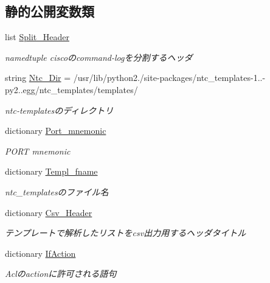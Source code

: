 \subsection*{静的公開変数類}
\begin{DoxyCompactItemize}
\item 
list \mbox{\hyperlink{classCTextFsm_1_1CTextFsm_aaae27a35f146f70f11ec0d40df0c8cdb}{Split\+\_\+\+Header}}
\begin{DoxyCompactList}\small\item\em namedtuple ciscoのcommand-\/logを分割するヘッダ \end{DoxyCompactList}\item 
\mbox{\label{classCTextFsm_1_1CTextFsm_abdcfff561e440d13d71126a84a9bfeab}} 
string \mbox{\hyperlink{classCTextFsm_1_1CTextFsm_abdcfff561e440d13d71126a84a9bfeab}{Ntc\+\_\+\+Dir}} = \textquotesingle{}/usr/lib/python2./site-\/packages/ntc\+\_\+templates-\/1..-\/py2..\+egg/ntc\+\_\+templates/templates/\textquotesingle{}
\begin{DoxyCompactList}\small\item\em ntc-\/templatesのディレクトリ \end{DoxyCompactList}\item 
dictionary \mbox{\hyperlink{classCTextFsm_1_1CTextFsm_a38d02993201dbf1e37d4025693d9a225}{Port\+\_\+mnemonic}}
\begin{DoxyCompactList}\small\item\em P\+O\+RT mnemonic \end{DoxyCompactList}\item 
dictionary \mbox{\hyperlink{classCTextFsm_1_1CTextFsm_afb88b6e8121f75c289acca130ebf33ab}{Templ\+\_\+fname}}
\begin{DoxyCompactList}\small\item\em ntc\+\_\+templatesのファイル名 \end{DoxyCompactList}\item 
dictionary \mbox{\hyperlink{classCTextFsm_1_1CTextFsm_acb48a0e8aa2360c087892d749792389a}{Csv\+\_\+\+Header}}
\begin{DoxyCompactList}\small\item\em テンプレートで解析したリストをcsv出力用するヘッダタイトル \end{DoxyCompactList}\item 
dictionary \mbox{\hyperlink{classCTextFsm_1_1CTextFsm_ac148270354b58b267ac87e23761b20e4}{If\+Action}}
\begin{DoxyCompactList}\small\item\em Aclのactionに許可される語句 \end{DoxyCompactList}\item 

\end{DoxyCompactItemize}

